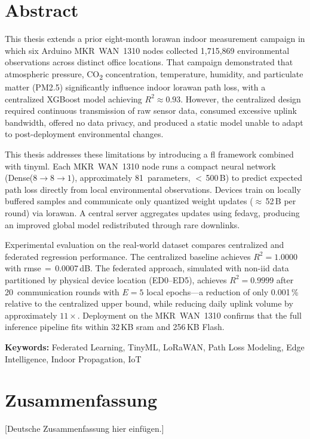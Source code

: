 \documentclass[12pt, a4paper, twoside, openright]{report}
\begin{document}
\chapter*{Abstract}

This thesis extends a prior eight-month \gls{lorawan} indoor measurement campaign in which six Arduino MKR~WAN~1310 nodes collected 1,715,869 environmental observations across distinct office locations. That campaign demonstrated that atmospheric pressure, CO\textsubscript{2} concentration, temperature, humidity, and particulate matter (PM2.5) significantly influence indoor \gls{lorawan} path loss, with a centralized XGBoost model achieving $R^2 \approx 0.93$. However, the centralized design required continuous transmission of raw sensor data, consumed excessive uplink bandwidth, offered no data privacy, and produced a static model unable to adapt to post-deployment environmental changes.

This thesis addresses these limitations by introducing a \gls{fl} framework combined with \gls{tinyml}. Each MKR~WAN~1310 node runs a compact neural network (Dense($8\!\to\!8\!\to\!1$), approximately 81~parameters, ${<}$\,500\,B) to predict expected path loss directly from local environmental observations. Devices train on locally buffered samples and communicate only quantized weight updates ($\approx$\,52\,B per round) via \gls{lorawan}. A central server aggregates updates using \gls{fedavg}, producing an improved global model redistributed through rare downlinks.

Experimental evaluation on the real-world dataset compares centralized and federated regression performance. The centralized baseline achieves $R^2 = 1.0000$ with \gls{rmse}\,$=$\,0.0007\,dB. The federated approach, simulated with non-\gls{iid} data partitioned by physical device location (ED0--ED5), achieves $R^2 = 0.9999$ after 20~communication rounds with $E=5$ local epochs---a reduction of only 0.001\,\% relative to the centralized upper bound, while reducing daily uplink volume by approximately $11\times$. Deployment on the MKR~WAN~1310 confirms that the full inference pipeline fits within 32\,KB \gls{sram} and 256\,KB Flash.

\noindent\textbf{Keywords:} Federated Learning, TinyML, LoRaWAN, Path Loss Modeling, Edge Intelligence, Indoor Propagation, IoT
\clearpage

\chapter*{Zusammenfassung}
[Deutsche Zusammenfassung hier einf\"ugen.]
\clearpage
\end{document}

